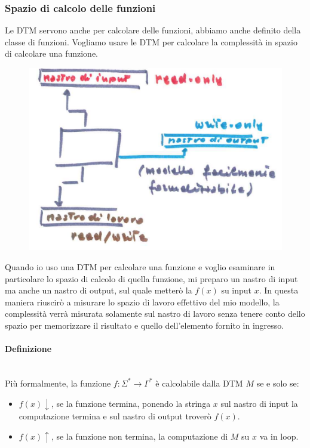\documentclass{article}
\begin{document}
\subsubsection{Spazio di calcolo delle funzioni}
Le DTM servono anche per calcolare delle funzioni, abbiamo anche definito della classe
di funzioni. Vogliamo usare le DTM per calcolare la complessità in spazio di calcolare una funzione.
\begin{figure}[H]
    \centering
    \includegraphics[scale=0.6]{images/DTM_func.png}
\end{figure}
Quando io uso una DTM per calcolare una funzione e voglio esaminare in particolare lo spazio
di calcolo di quella funzione, mi preparo un nastro di input ma anche un nastro di output, sul
quale metterò la $f(x)$ su input $x$. In questa maniera riuscirò a misurare lo spazio di lavoro
effettivo del mio modello, la complessità verrà misurata solamente sul nastro di lavoro senza
tenere conto dello spazio per memorizzare il risultato e quello dell'elemento fornito in ingresso.

\paragraph{Definizione}\mbox{}\\
Più formalmente, la funzione $f:\Sigma^*\rightarrow\Gamma^*$ è calcolabile dalla DTM $M$ se e solo se:
\begin{itemize}
    \item $f(x)\downarrow$, se la funzione termina, ponendo la stringa $x$ sul nastro di input la computazione
    termina e sul nastro di output troverò $f(x)$.
    \item $f(x)\uparrow$, se la funzione non termina, la computazione di $M$ su $x$ va in loop.
\end{itemize}
\end{document}
